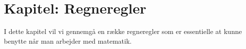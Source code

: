 \section{Kapitel: Regneregler}

I dette kapitel vil vi gennemgå en række regneregler som er essentielle at kunne benytte når man arbejder med matematik.